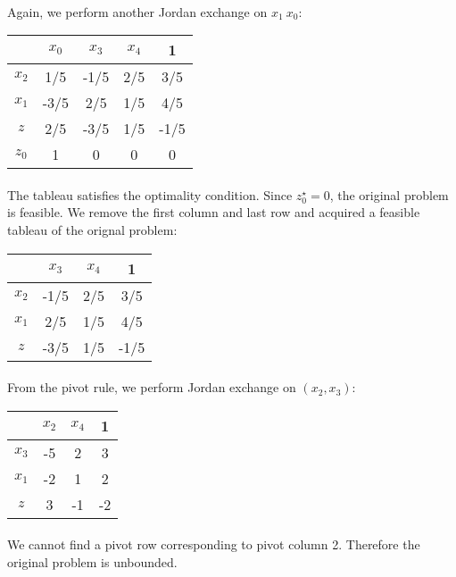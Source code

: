 \paragraph{}
Again, we perform another Jordan exchange on $x_1 \ x_0$:
\begin{center}
	\begin{tabular}{ c | c  c  c | c }
		\      & $x_0$ & $x_3$ & $x_4$ &    1 \\ \hline
		$x_2$  &   1/5 &  -1/5 &   2/5 &  3/5 \\ 
		$x_1$  &  -3/5 &   2/5 &   1/5 &  4/5 \\ \hline
		$z$    &   2/5 &  -3/5 &   1/5 & -1/5 \\
		$z_0$  &     1 &     0 &   0   &    0 \\ 
	\end{tabular}
\end{center}
\paragraph{}
The tableau satisfies the optimality condition. Since $z_0^\star = 0$, the original problem is feasible. We remove the first column and last row and acquired a feasible tableau of the orignal problem:
\begin{center}
	\begin{tabular}{ c | c  c | c }
		\      & $x_3$ & $x_4$ &    1 \\ \hline
		$x_2$  &  -1/5 &   2/5 &  3/5 \\ 
		$x_1$  &   2/5 &   1/5 &  4/5 \\ \hline
		$z$    &  -3/5 &   1/5 & -1/5 \\
	\end{tabular}
\end{center}
\paragraph{}
From the pivot rule, we perform Jordan exchange on $(x_2, x_3)$:
\begin{center}
	\begin{tabular}{ c | c  c | c }
		\      & $x_2$ & $x_4$ &    1 \\ \hline
		$x_3$  &    -5 &     2 &    3 \\ 
		$x_1$  &    -2 &     1 &    2 \\ \hline
		$z$    &     3 &    -1 &   -2 \\
	\end{tabular}
\end{center}
\paragraph{}
We cannot find a pivot row corresponding to pivot column 2. Therefore the original problem is unbounded. 